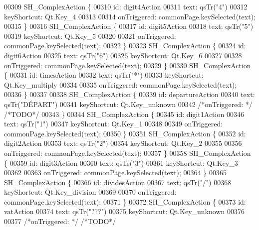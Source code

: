 \begin{DoxyCode}
00309     SH\_ComplexAction \{
00310         \textcolor{keywordtype}{id}: digit4Action
00311         text: qsTr(\textcolor{stringliteral}{"4"})
00312         keyShortcut: Qt.Key\_4
00313 
00314         onTriggered: commonPage.keySelected(text);
00315     \}
00316     SH\_ComplexAction \{
00317         \textcolor{keywordtype}{id}: digit5Action
00318         text: qsTr(\textcolor{stringliteral}{"5"})
00319         keyShortcut: Qt.Key\_5
00320 
00321         onTriggered: commonPage.keySelected(text);
00322     \}
00323     SH\_ComplexAction \{
00324         \textcolor{keywordtype}{id}: digit6Action
00325         text: qsTr(\textcolor{stringliteral}{"6"})
00326         keyShortcut: Qt.Key\_6
00327 
00328         onTriggered: commonPage.keySelected(text);
00329     \}
00330     SH\_ComplexAction \{
00331         \textcolor{keywordtype}{id}: timesAction
00332         text: qsTr(\textcolor{stringliteral}{"*"})
00333         keyShortcut: Qt.Key\_multiply
00334 
00335         onTriggered: commonPage.keySelected(text);
00336     \}
00337 
00338     SH\_ComplexAction \{
00339         \textcolor{keywordtype}{id}: departureAction
00340         text: qsTr(\textcolor{stringliteral}{"DÉPART"})
00341         keyShortcut: Qt.Key\_unknown
00342         \textcolor{comment}{/*onTriggered: */} \textcolor{comment}{/*TODO*/}
00343     \}
00344     SH\_ComplexAction \{
00345         \textcolor{keywordtype}{id}: digit1Action
00346         text: qsTr(\textcolor{stringliteral}{"1"})
00347         keyShortcut: Qt.Key\_1
00348 
00349         onTriggered: commonPage.keySelected(text);
00350     \}
00351     SH\_ComplexAction \{
00352         \textcolor{keywordtype}{id}: digit2Action
00353         text: qsTr(\textcolor{stringliteral}{"2"})
00354         keyShortcut: Qt.Key\_2
00355 
00356         onTriggered: commonPage.keySelected(text);
00357     \}
00358     SH\_ComplexAction \{
00359         \textcolor{keywordtype}{id}: digit3Action
00360         text: qsTr(\textcolor{stringliteral}{"3"})
00361         keyShortcut: Qt.Key\_3
00362 
00363         onTriggered: commonPage.keySelected(text);
00364     \}
00365     SH\_ComplexAction \{
00366         \textcolor{keywordtype}{id}: dividesAction
00367         text: qsTr(\textcolor{stringliteral}{"/"})
00368         keyShortcut: Qt.Key\_division
00369 
00370         onTriggered: commonPage.keySelected(text);
00371     \}
00372     SH\_ComplexAction \{
00373         \textcolor{keywordtype}{id}: vatAction
00374         text: qsTr(\textcolor{stringliteral}{"???"})
00375         keyShortcut: Qt.Key\_unknown
00376 
00377         \textcolor{comment}{/*onTriggered: */} \textcolor{comment}{/*TODO*/}

\end{DoxyCode}

